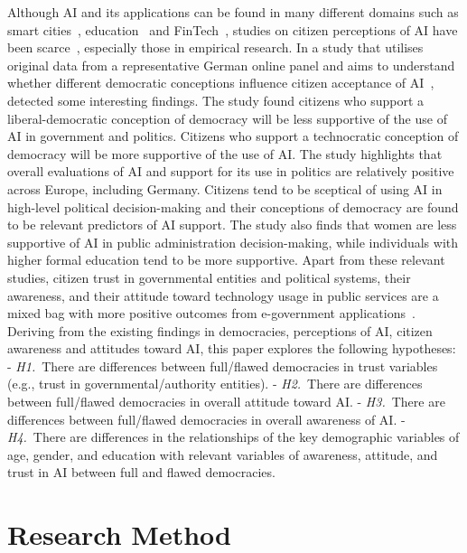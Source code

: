 \documentclass[
]{ceurart}
\begin{document}
Although AI and its applications can be found in many different domains such as smart cities~\cite{pham2016key}, education~\cite{mai2019students} and 
FinTech~\cite{nguyen2022cryptocurrency}, studies on citizen perceptions of AI have been scarce~\cite{konig2022citizen}, especially those in empirical research. In a study that utilises original data from a representative German online panel and aims to understand whether different democratic conceptions influence citizen acceptance of 
AI~\cite{konig2022citizen}, detected some interesting findings. The study found citizens who support a liberal-democratic conception of democracy will be less supportive of the use of AI in government and politics. Citizens who support a technocratic conception of democracy will be more supportive of the use of AI.
The study highlights that overall evaluations of AI and support for its use in politics are relatively positive across Europe, including Germany. Citizens tend to be sceptical of using AI in high-level political decision-making and their conceptions of democracy are found to be relevant predictors of AI support. The study also finds that women are less supportive of AI in public administration decision-making, while individuals with higher formal education tend to be more supportive. 
Apart from these relevant studies, citizen trust in governmental entities and political systems, their awareness, and their attitude toward technology usage in public services are a mixed bag with more positive outcomes from e-government applications~\cite{pena2020oecd, duberry2022artificial}. Deriving from the existing findings in democracies, perceptions of AI, citizen awareness and attitudes toward AI, this paper explores the following hypotheses:
-  \textit{H1.}~There are differences between full/flawed democracies in trust variables (e.g., trust in governmental/authority entities).
-  \textit{H2.}~There are differences between full/flawed democracies in overall attitude toward AI.
- \textit{H3.}~There are differences between full/flawed democracies in overall awareness of AI.
-  \textit{H4.}~There are differences in the relationships of the key demographic variables of age, gender, and education with relevant variables of awareness, attitude, and trust in AI between full and flawed democracies.
\section{Research Method}
\end{document}
